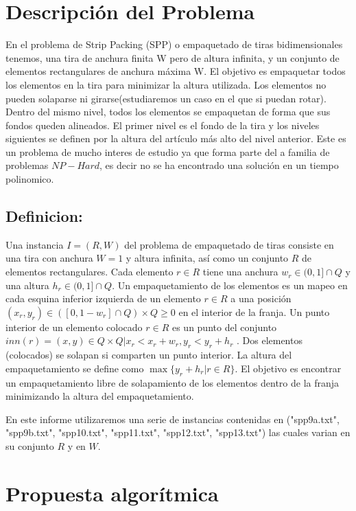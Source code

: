 \documentclass[10pt]{article}
\begin{document}
\section{Descripción del Problema}
En el problema  de Strip Packing (SPP) o empaquetado de tiras bidimensionales tenemos, una tira de anchura finita W pero de altura infinita, y un conjunto de elementos rectangulares de anchura máxima W. 
	El objetivo es empaquetar todos los elementos en la tira para minimizar la altura utilizada. Los elementos no pueden solaparse ni girarse(estudiaremos un caso en el que si puedan rotar). 
Dentro del mismo nivel, todos los elementos se empaquetan de forma que sus fondos queden alineados. El primer nivel es el fondo de la tira y los niveles siguientes se definen por la altura del artículo más alto del nivel anterior.
	Este es un problema de mucho interes de estudio ya que forma parte del a familia de problemas $NP-Hard$, es decir no se ha encontrado una solución en un tiempo polinomico.

\subsection{Definicion:}
Una instancia $ I = (R,W)$  del problema de empaquetado de tiras consiste en una tira con anchura $W = 1$ y altura infinita, así como un conjunto $R$  de elementos rectangulares. Cada elemento $r   \in   R$ tiene una anchura  $w_r \in  (0,1]  \cap  Q $ y una altura  $h_r     \in   (0,1] \cap Q $. Un empaquetamiento de los elementos es un mapeo en cada esquina inferior izquierda de un elemento $r    \in   R$  a una posición $(x_r,y_r) \in([0,1 - w_r] \cap Q) \times Q\geq 0$ en el interior de la franja. 
Un punto interior de un elemento colocado $ r \in  R $ es un punto del conjunto $inn(r)={(x,y) \in Q\times Q | x_r < x_r + w_r , y_r<y_r+h_r}$ .
Dos elementos (colocados) se solapan si comparten un punto interior. La altura del empaquetamiento se define como $ \max \{ y_r + h_r | r \in R\} $. El objetivo es encontrar un empaquetamiento libre de solapamiento de los elementos dentro de la franja minimizando la altura del empaquetamiento.

 En este informe utilizaremos una serie de instancias 
contenidas en ("spp9a.txt", "spp9b.txt", "spp10.txt", "spp11.txt", "spp12.txt", "spp13.txt") las cuales varian en su conjunto $R$ y en $W$.

\section{Propuesta algorítmica} %
\end{document}
